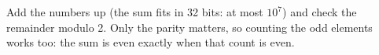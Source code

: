 Add the numbers up (the sum fits in 32 bits: at most $10^7$) and check the
remainder modulo 2. Only the parity matters, so counting the odd elements works
too: the sum is even exactly when that count is even.
